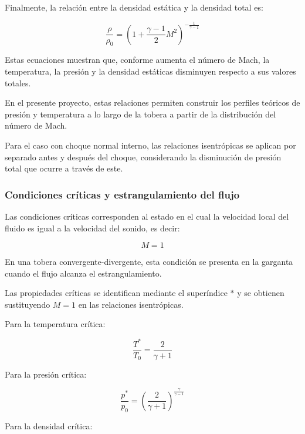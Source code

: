 \documentclass[12pt,letterpaper]{article}
\numberwithin{equation}{section}
\begin{document}
Finalmente, la relación entre la densidad
estática y la densidad total es:

\begin{equation}
    \frac{\rho}{\rho_0}=
    \left(1+\frac{\gamma-1}{2}M^2\right)^{
    -\frac{1}{\gamma-1}}
    \label{eq:relacion_densidad}
\end{equation}

Estas ecuaciones muestran que, conforme
aumenta el número de Mach, la temperatura,
la presión y la densidad estáticas
disminuyen respecto a sus valores totales.

En el presente proyecto, estas relaciones
permiten construir los perfiles teóricos
de presión y temperatura a lo largo de
la tobera a partir de la distribución
del número de Mach.

Para el caso con choque normal interno,
las relaciones isentrópicas se aplican
por separado antes y después del choque,
considerando la disminución de presión
total que ocurre a través de este.


\subsubsection{Condiciones críticas y
estrangulamiento del flujo}

Las condiciones críticas corresponden
al estado en el cual la velocidad local
del fluido es igual a la velocidad
del sonido, es decir:

\begin{equation}
    M=1
\end{equation}

En una tobera convergente-divergente,
esta condición se presenta en la
garganta cuando el flujo alcanza
el estrangulamiento.

Las propiedades críticas se identifican
mediante el superíndice $*$ y se obtienen
sustituyendo $M=1$ en las relaciones
isentrópicas.

Para la temperatura crítica:

\begin{equation}
    \frac{T^*}{T_0}
    =\frac{2}{\gamma+1}
\end{equation}

Para la presión crítica:

\begin{equation}
    \frac{p^*}{p_0}
    =\left(\frac{2}{\gamma+1}\right)^{
    \frac{\gamma}{\gamma-1}}
\end{equation}

Para la densidad crítica:
\end{document}
